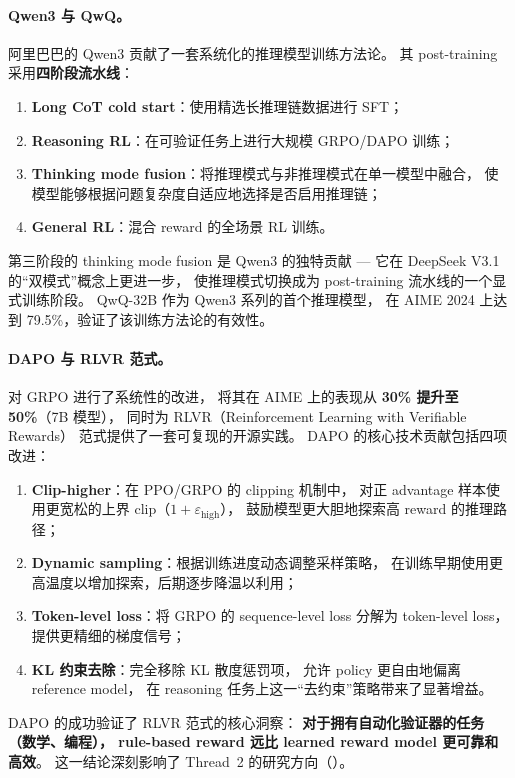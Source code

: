 \paragraph{Qwen3 与 QwQ。}
阿里巴巴的 Qwen3 \cite{yang2025qwen3} 贡献了一套系统化的推理模型训练方法论。
其 post-training 采用\textbf{四阶段流水线}：
\begin{enumerate}[leftmargin=2em]
  \item \textbf{Long CoT cold start}：使用精选长推理链数据进行 SFT；
  \item \textbf{Reasoning RL}：在可验证任务上进行大规模 GRPO/DAPO 训练；
  \item \textbf{Thinking mode fusion}：将推理模式与非推理模式在单一模型中融合，
    使模型能够根据问题复杂度自适应地选择是否启用推理链；
  \item \textbf{General RL}：混合 reward 的全场景 RL 训练。
\end{enumerate}
第三阶段的 thinking mode fusion 是 Qwen3 的独特贡献 ---
它在 DeepSeek V3.1 的``双模式''概念上更进一步，
使推理模式切换成为 post-training 流水线的一个显式训练阶段。
QwQ-32B \cite{qwen2025qwq} 作为 Qwen3 系列的首个推理模型，
在 AIME 2024 上达到 79.5\%，验证了该训练方法论的有效性。

\paragraph{DAPO 与 RLVR 范式。}
 对 GRPO 进行了系统性的改进，
将其在 AIME 上的表现从 \textbf{30\% 提升至 50\%}（7B 模型），
同时为 RLVR（Reinforcement Learning with Verifiable Rewards）
范式提供了一套可复现的开源实践。
DAPO 的核心技术贡献包括四项改进：
\begin{enumerate}[leftmargin=2em]
  \item \textbf{Clip-higher}：在 PPO/GRPO 的 clipping 机制中，
    对正 advantage 样本使用更宽松的上界 clip（$1 + \varepsilon_{\text{high}}$），
    鼓励模型更大胆地探索高 reward 的推理路径；
  \item \textbf{Dynamic sampling}：根据训练进度动态调整采样策略，
    在训练早期使用更高温度以增加探索，后期逐步降温以利用；
  \item \textbf{Token-level loss}：将 GRPO 的 sequence-level loss
    分解为 token-level loss，提供更精细的梯度信号；
  \item \textbf{KL 约束去除}：完全移除 KL 散度惩罚项，
    允许 policy 更自由地偏离 reference model，
    在 reasoning 任务上这一``去约束''策略带来了显著增益。
\end{enumerate}
DAPO 的成功验证了 RLVR 范式的核心洞察：
\textbf{对于拥有自动化验证器的任务（数学、编程），
rule-based reward 远比 learned reward model 更可靠和高效}。
这一结论深刻影响了 Thread~2 的研究方向（）。

